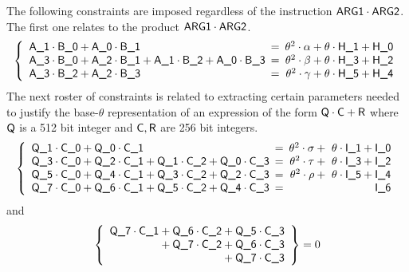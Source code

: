 The following constraints are imposed regardless of the instruction $\textsf{ARG}\textsf{1} \cdot \textsf{ARG}\textsf{2}$.
The first one relates to the product $\textsf{ARG}\textsf{1} \cdot \textsf{ARG}\textsf{2}$.
\[
\left\{
\begin{array}{lcr}
	  \col{A\_1} \cdot \col{B\_0}
	+ \col{A\_0} \cdot \col{B\_1} & \!\!\! = \!\!\! &
	\theta^2 \cdot \alpha + \theta \cdot \col{H\_1} + \col{H\_0} \\
	  \col{A\_3} \cdot \col{B\_0}
	+ \col{A\_2} \cdot \col{B\_1}
	+ \col{A\_1} \cdot \col{B\_2}
	+ \col{A\_0} \cdot \col{B\_3} & \!\!\! = \!\!\! &
	\theta^2 \cdot \beta + \theta \cdot \col{H\_3} + \col{H\_2} \\
	  \col{A\_3} \cdot \col{B\_2}
	+ \col{A\_2} \cdot \col{B\_3} & \!\!\! = \!\!\! &
	\theta^2 \cdot \gamma + \theta \cdot \col{H\_5} + \col{H\_4} \\
\end{array}
\right.
\]
\noindent The next roster of constraints is related to extracting certain parameters needed to justify the base-$\theta$ representation of an expression of the form $\textsf{Q} \cdot \textsf{C} + \textsf{R}$ where
$\textsf{Q}$ is a 512 bit integer and
$\textsf{C}, \textsf{R}$ are 256 bit integers.
\[
\left\{
\begin{array}{lcr}
	  \col{Q\_1} \cdot \col{C\_0}
	+ \col{Q\_0} \cdot \col{C\_1} & \!\!\! = \!\!\! &
	\theta^2 \cdot \sigma
	+ \,\, \theta \cdot \col{I\_1} + \col{I\_0} \\
	  \col{Q\_3} \cdot \col{C\_0}
	+ \col{Q\_2} \cdot \col{C\_1}
	+ \col{Q\_1} \cdot \col{C\_2}
	+ \col{Q\_0} \cdot \col{C\_3} & \!\!\! = \!\!\! &
	\theta^2 \cdot \tau
	+ \,\, \theta \cdot \col{I\_3} + \col{I\_2} \\
	  \col{Q\_5} \cdot \col{C\_0}
	+ \col{Q\_4} \cdot \col{C\_1}
	+ \col{Q\_3} \cdot \col{C\_2}
	+ \col{Q\_2} \cdot \col{C\_3} & \!\!\! = \!\!\! &
	\theta^2 \cdot \rho
	+ \,\, \theta \cdot \col{I\_5} + \col{I\_4} \\
	  \col{Q\_7} \cdot \col{C\_0}
	+ \col{Q\_6} \cdot \col{C\_1}
	+ \col{Q\_5} \cdot \col{C\_2}
	+ \col{Q\_4} \cdot \col{C\_3} & \!\!\! = \!\!\! &
	\col{I\_6} \\
\end{array}
\right.
\]
and
\[
\left\{
\begin{array}{l}
	\col{Q\_7} \cdot \col{C\_1}
	+	\col{Q\_6} \cdot \col{C\_2}
	+	\col{Q\_5} \cdot \col{C\_3} \\
	\phantom{\col{Q\_7} \cdot \col{C\_1}}
	+	\col{Q\_7} \cdot \col{C\_2}
	+	\col{Q\_6} \cdot \col{C\_3} \\
	\phantom{\col{Q\_7} \cdot \col{C\_1} + \col{Q\_7} \cdot \col{C\_1}}
	+	\col{Q\_7} \cdot \col{C\_3}
\end{array}
\right\} = 0
\]
